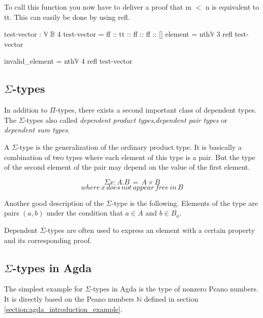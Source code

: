 To call this function you now have to deliver a proof that m $<$ n is equivalent to tt. This can easily be done by using refl. 
\begin{codesnippet}[mathescape=true, caption={Usage of \emph{nth} function in Agda}, label={codeSnippet:vector_nth_usage}]
test-vector : $\mathbb{V}$ $\mathbb{B}$ 4
test-vector = ff :: tt :: ff :: ff :: []
element = nth$\mathbb{V}$ 3 refl test-vector

invalid_element = nth$\mathbb{V}$ 4 refl test-vector
\end{codesnippet}


\subsection{$\Sigma$-types}
In addition to $\Pi$-types, there exists a second important class of dependent types. 
The $\Sigma$-types also called \emph{dependent product types}\cite{10.1145/2841316},\emph{dependent pair types}\cite{10.1145/2841316} or \emph{dependent sum types}\cite{10.5555/1076265}.

A $\Sigma$-type is the generalization of the ordinary product type. 
It is basically a combination of two types where each element of this type is a pair. 
But the type of the second element of the pair may depend on the value of the first element.

$$\Sigma x: A.B \,= \, A \times B$$
$$where \, x \, does \, not \, appear \, free \, in \, B$$


Another good description of the $\Sigma$-type is the following. 
Elements of the type are pairs $(a, b)$ under the condition that $a \in A$ and $b \in B_a$.

Dependent $\Sigma$-types are often used to express an element with a certain property and its corresponding proof.

\subsection{$\Sigma$-types in Agda}
The simplest example for $\Sigma$-types in Agda is the type of nonzero Peano numbers.
It is directly based on the Peano numbers $\mathbb{N}$ defined in section \ref{section:agda_introduction_example}.

